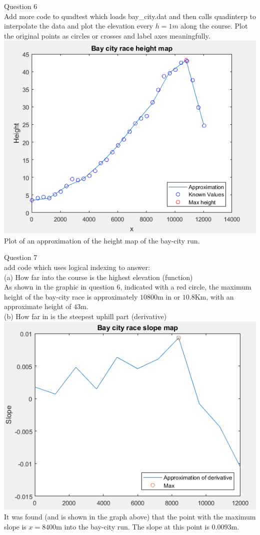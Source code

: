 \documentclass[a4paper]{article}
\begin{document}
		\newpage
	Question 6\\
	Add more code to quadtest which loads bay\_city.dat and then calls quadinterp to interpolate the data and plot the elevation every $h=1m$ along the course. Plot the original points as circles or crosses and label axes meaningfully.
	\includegraphics{baycityheight.PNG}
	\\
	Plot of an approximation of the height map of the bay-city run.
	
	\newpage
	Question 7\\
	add code which uses logical indexing to answer:\\
	(a) How far into the course is the highest elevation (function)
	\\
	As shown in the graphic in question 6, indicated with a red circle, the maximum height of the bay-city race is approximately $10800$m in or $10.8$Km, with an approximate height of  $43$m.\\

	(b) How far in is the steepest uphill part (derivative)\\
	\includegraphics{baycityderiv.PNG}
	\\
	It was found (and is shown in the graph above) that the point with the maximum slope is $x=8400$m into the bay-city run. The slope at this point is $0.0093$m.
	
\end{document}
